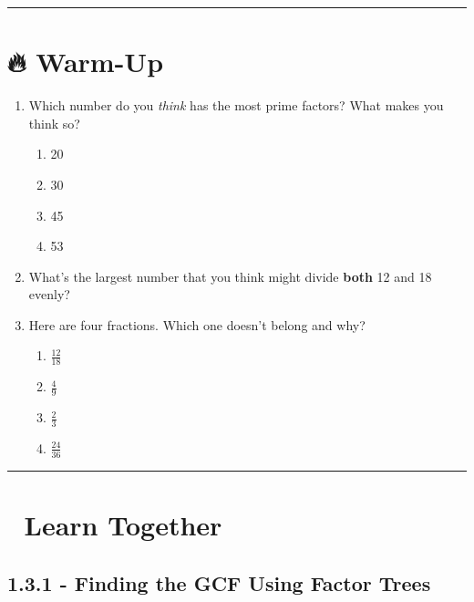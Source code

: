 \documentclass[
  letterpaper,
  DIV=11,
  numbers=noendperiod]{scrreprt}
\begin{document}
\begin{center}\rule{0.5\linewidth}{0.5pt}\end{center}

\section*{🔥 Warm-Up}\label{warm-up-2}


\begin{enumerate}
\def\labelenumi{\arabic{enumi}.}
\item
  Which number do you \emph{think} has the most prime factors? What
  makes you think so?

  \begin{enumerate}
  \def\labelenumii{\alph{enumii}.}
  \item
    20
  \item
    30
  \item
    45
  \item
    53
  \end{enumerate}
\item
  What's the largest number that you think might divide \textbf{both} 12
  and 18 evenly?
\item
  Here are four fractions. Which one doesn't belong and why?

  \begin{enumerate}
  \def\labelenumii{\alph{enumii}.}
  \item
    \(\frac{12}{18}\)
  \item
    \(\frac{4}{9}\)
  \item
    \(\frac{2}{3}\)
  \item
    \(\frac{24}{36}\)
  \end{enumerate}
\end{enumerate}

\begin{center}\rule{0.5\linewidth}{0.5pt}\end{center}

\section*{👥 Learn Together}\label{learn-together-2}


\subsection*{1.3.1 - Finding the GCF Using Factor
Trees}\label{finding-the-gcf-using-factor-trees}
\end{document}
